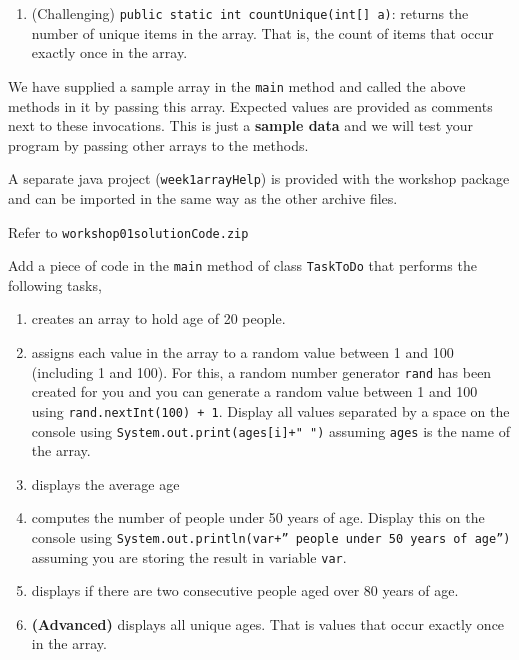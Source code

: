 \begin{questions}
\begin{enumerate}
\item (Challenging) \texttt{public static int countUnique(int[] a)}: returns the number of unique items in the array. That is, the count of items that occur exactly once in the array.
\end{enumerate}

We have supplied a sample array in the \texttt{main} method and called the above methods in it by passing this array. Expected values are provided as comments next to these invocations. This is just a \textbf{sample data} and we will test your program by passing other arrays to the methods.

A separate java project (\texttt{week1arrayHelp}) is provided with the workshop package and can be imported in the same way as the other archive files.

\begin{solution}
Refer to \texttt{workshop01solutionCode.zip}	
\end{solution}

\question Add a piece of code in the \texttt{main} method of class \texttt{TaskToDo}  that performs the following tasks,

\begin{enumerate}
\item creates an array to hold age of 20 people. 

\item assigns each value in the array to a random value between 1 and 100 (including 1 and 100). For this, a random number generator \texttt{rand} has been created for you and you can generate a random value between 1 and 100 using \texttt{rand.nextInt(100) + 1}. Display all values separated by a space on the console using \texttt{System.out.print(ages[i]+" ")} assuming \texttt{ages} is the name of the array.

\item displays the average age

\item computes the number of people under 50 years of age. Display this on the console using \texttt{System.out.println(var+'' people under 50 years of age'')} assuming you are storing the result in variable \texttt{var}. 

\item displays if there are two consecutive people aged over 80 years of age.

\item \textbf{(Advanced)} displays all unique ages. That is values that occur exactly once in the array.
\end{enumerate}


\end{questions}
